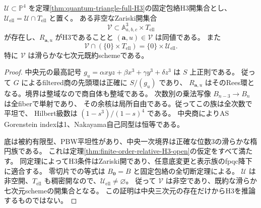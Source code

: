 \begin{proposition}
\label{prop:triangle-seven-H3}
$\mathcal U\subset\mathbb P^4$ を定理\ref{thm:quantum-triangle-full-H3}の固定包絡H3開集合とし、
$\mathcal U_{\mathrm{ell}}=\mathcal U\cap T_{\mathrm{ell}}$ と置く。
ある非空なZariski開集合
\[
 \mathcal V\subset\mathbb A^3_{a,b,c}\times T_{\mathrm{ell}}
\]
が存在し、$R_{\boldsymbol a,u}$ がH3であることと $(\boldsymbol a,u)\in\mathcal V$ は同値である。
また
\[
 \mathcal V\cap(\{0\}\times T_{\mathrm{ell}})=\{0\}\times\mathcal U_{\mathrm{ell}}.
\]
特に $\mathcal V$ は滑らかな七次元既約schemeである。
\end{proposition}
\begin{proof}
中央元の最高記号 $g_u=\alpha xyz+\beta x^3+\gamma y^3+\delta z^3$ は $S$ 上正則である。
従って $G$ によるfiltered商の先頭環は正確に $S/(g_u)$ であり、
$R_{\boldsymbol a,u}$ はそのRees環となる。境界は整域なので商自体も整域である。
次数別の乗法写像 $B_{n-3}\to B_n$ は全fiberで単射であり、
その余核は局所自由である。従ってこの族は全次数で平坦で、
Hilbert級数は $(1-s^3)/(1-s)^4$ である。
中央商によりAS Gorenstein indexは1、Nakayama自己同型は恒等である。

底は被約有限型、PBW平坦性があり、中央一次境界は正確な位数3の滑らかな楕円族である。
これは定理\ref{thm:finite-order-relative-H3-open}の仮定をすべて満たす。
同定理によってH3条件はZariski開であり、任意底変更と表示族のfpqc降下に適合する。
零切片での等式は $B_{\boldsymbol0}=B$ と固定包絡の全切断定理による。
$\mathcal U$ は非空開、$T_{\mathrm{ell}}$ も稠密開なので、$\mathcal U_{\mathrm{ell}}\ne\varnothing$。
従って $\mathcal V$ は非空であり、既約な滑らか七次元schemeの開集合となる。
この証明は中央三次元の存在だけからH3を推論するものではない。
\end{proof}

